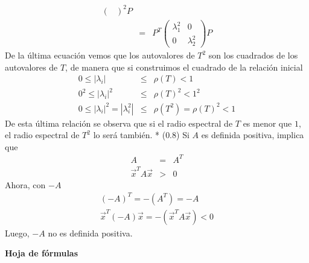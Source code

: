 \documentclass[12pt]{article}
\begin{document}
\begin{enumerate}[leftmargin=*,widest=9]
\begin{eqnarray*}
\begin{pmatrix}
  \end{pmatrix}^2 P\\
  & = & P^T \begin{pmatrix}
  \lambda_1^2 & 0\\ 0 & \lambda_2^2
  \end{pmatrix} P
  \end{eqnarray*}
  De la última ecuación vemos que los autovalores de \(T^2\) son los cuadrados de los autovalores de \(T\), de manera que si construimos el cuadrado de la relación inicial
  \begin{eqnarray*}
  0 \leq |\lambda_i| &\leq& \rho(T) < 1 \\
  0^2 \leq |\lambda_i|^2 &\leq& \rho(T)^2 < 1^2\\
  0 \leq |\lambda_i|^2 = |\lambda_i^2| &\leq& \rho(T^2) = \rho(T)^2 < 1
  \end{eqnarray*}
  De esta última relación se observa que si el radio espectral de \(T\) es menor que \(1\), el radio espectral de \(T^2\) lo será también.
  * (\(0.8\)) 
  Si \(A\) es definida positiva, implica que 
  \begin{eqnarray*}
  A &=& A^T\\
  \vec{x}^T A \vec{x} &>& 0
  \end{eqnarray*}
  Ahora, con \(-A\)
  \begin{eqnarray*}
  (-A)^T = -(A^T) = -A  \\
  \vec{x}^T (-A) \vec{x} = -(\vec{x}^T A \vec{x}) < 0
  \end{eqnarray*}
  Luego, \(-A\) no es definida positiva.
  \end{enumerate}
\clearpage
\begin{center}
\textbf{Hoja de fórmulas}
\end{center}
\end{document}
